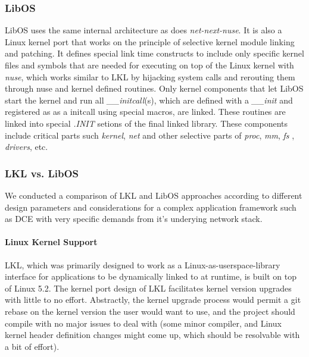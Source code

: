 \documentclass{sig-alternate}
\begin{document}
\subsubsection{LibOS}
LibOS uses the same internal architecture as does \textit{net-next-nuse}.
It is also a Linux kernel port that works on the principle of selective 
kernel module linking and patching. It defines special link time constructs
to include only specific kernel files and 
symbols that are needed for executing on top of the Linux kernel with \textit{nuse}, which works similar to LKL by hijacking system calls 
and rerouting them through nuse and kernel defined routines. Only kernel components that let LibOS start the kernel and run all \textit{\_\_initcall}(s),
which are defined with a \textit{\_\_init} and registered as as a initcall using special macros, are linked. These routines are linked into special \textit{.INIT} 
setions of the final linked library. These components include critical parts such \textit{kernel}, \textit{net} and other selective parts of \textit{proc},
\textit{mm}, \textit{fs} , \textit{drivers}, etc. 

\subsubsection{LKL vs. LibOS}
We conducted a comparison of LKL and LibOS approaches according to different design parameters and considerations for a complex application framework such as
DCE with very specific demands from it's underying network stack.

\paragraph{Linux Kernel Support}
LKL, which was primarily designed to work as a Linux-as-userspace-library interface for applications to be dynamically linked to at runtime, is built on top of 
Linux 5.2. The kernel port design of LKL facilitates kernel version upgrades with little to no effort. Abstractly, the kernel upgrade process 
would permit a git rebase on the kernel version the user would want to use, and the project should compile with no major issues to deal with (some minor compiler, 
and Linux kernel header definition changes might come up, which should be resolvable with a bit of effort).
\end{document}

